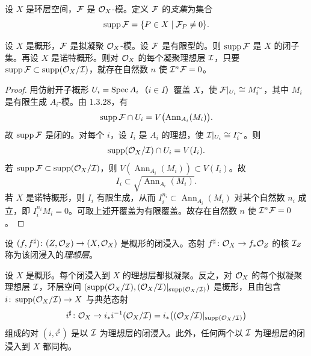 
设 $X$ 是环层空间，$\mathcal{F}$ 是 $\mathcal{O}_X$-模。定义 $\mathcal{F}$ 的\emph{支集}为集合
\[
\operatorname{supp}\mathcal{F}=\{P\in X\mid\mathcal{F}_P\ne0\}.
\]

\begin{proposition}\label{it:1.4.14}
设 $X$ 是概形，$\mathcal{F}$ 是拟凝聚 $\mathcal{O}_X$-模。设 $\mathcal{F}$ 是有限型的。则 $\operatorname{supp}\mathcal{F}$ 是 $X$ 的闭子集。再设 $X$ 是诺特概形。则对 $\mathcal{O}_X$ 的每个凝聚理想层 $\mathcal{I}$，只要 $\operatorname{supp}\mathcal{F}\subset\operatorname{supp}(\mathcal{O}_X/\mathcal{I})$，就存在自然数 $n$ 使 $\mathcal{I}^n\mathcal{F}=0$。
\end{proposition}

\begin{proof}
用仿射开子概形 $U_i=\operatorname{Spec} A_i$（$i\in I$）覆盖 $X$，使 $\mathcal{F}|_{U_i}\cong M_i^\sim$，其中 $M_i$ 是有限生成 $A_i$-模。由 1.3.28，有
\[
\operatorname{supp}\mathcal{F}\cap U_i=V\bigl(\operatorname{Ann}_{A_i}(M_i)\bigr).
\]
故 $\operatorname{supp}\mathcal{F}$ 是闭的。对每个 $i$，设 $I_i$ 是 $A_i$ 的理想，使 $\mathcal{I}|_{U_i}\cong I_i^\sim$。则
\[
\operatorname{supp}(\mathcal{O}_X/\mathcal{I})\cap U_i=V(I_i).
\]
若 $\operatorname{supp}\mathcal{F}\subset\operatorname{supp}(\mathcal{O}_X/\mathcal{I})$，则 $V(\operatorname{Ann}_{A_i}(M_i))\subset V(I_i)$。故
\[
I_i\subset\sqrt{\operatorname{Ann}_{A_i}(M_i)}.
\]
若 $X$ 是诺特概形，则 $I_i$ 有限生成，从而 $I_i^{n_i}\subset\operatorname{Ann}_{A_i}(M_i)$ 对某个自然数 $n_i$ 成立，即 $I_i^{n_i}M_i=0$。可取上述开覆盖为有限覆盖。故存在自然数 $n$ 使 $\mathcal{I}^n\mathcal{F}=0$。
\end{proof}

设 $(f,f^\sharp)\colon(Z,\mathcal{O}_Z)\to(X,\mathcal{O}_X)$ 是概形的闭浸入。态射 $f^\sharp\colon\mathcal{O}_X\to f_*\mathcal{O}_Z$ 的核 $\mathcal{I}_Z$ 称为该闭浸入的\emph{理想层}。

\begin{proposition}\label{it:1.4.15}
设 $X$ 是概形。每个闭浸入到 $X$ 的理想层都拟凝聚。反之，对 $\mathcal{O}_X$ 的每个拟凝聚理想层 $\mathcal{I}$，环层空间 $(\operatorname{supp}(\mathcal{O}_X/\mathcal{I}),(\mathcal{O}_X/\mathcal{I})|_{\operatorname{supp}(\mathcal{O}_X/\mathcal{I})})$ 是概形，且由包含 $i\colon\operatorname{supp}(\mathcal{O}_X/\mathcal{I})\to X$ 与典范态射
\[
i^\sharp\colon\mathcal{O}_X\to i_*i^{-1}(\mathcal{O}_X/\mathcal{I})=i_*\bigl((\mathcal{O}_X/\mathcal{I})|_{\operatorname{supp}(\mathcal{O}_X/\mathcal{I})}\bigr)
\]
组成的对 $(i,i^\sharp)$ 是以 $\mathcal{I}$ 为理想层的闭浸入。此外，任何两个以 $\mathcal{I}$ 为理想层的闭浸入到 $X$ 都同构。
\end{proposition}


